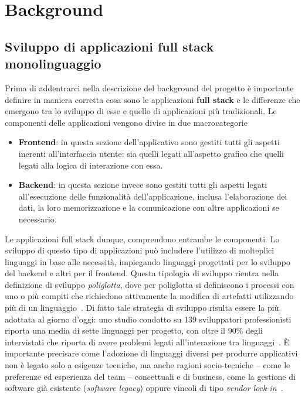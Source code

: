 \section{Background}
\label{chap:background}


\subsection{Sviluppo di applicazioni full stack monolinguaggio}
\label{sec:background-fullstack}
Prima di addentrarci nella descrizione del background del progetto è importante definire in maniera corretta cosa sono le applicazioni \textbf{full stack} e le differenze che emergono tra lo sviluppo di esse e quello di applicazioni più tradizionali.
Le componenti delle applicazioni vengono divise in due macrocategorie
\begin{itemize}
    \item \textbf{Frontend}: in questa sezione dell'applicativo sono gestiti tutti gli aspetti
    inerenti all'interfaccia utente: sia quelli legati all'aspetto grafico che quelli legati alla 
    logica di interazione con essa.
    \item \textbf{Backend}: in questa sezione invece sono gestiti tutti gli aspetti legati\\
    all'esecuzione delle funzionalità dell'applicazione, inclusa l'elaborazione dei dati, la loro
    memorizzazione e la comunicazione con altre applicazioni se necessario. 
\end{itemize}
Le applicazioni full stack dunque, comprendono entrambe le componenti.
Lo sviluppo di questo tipo di applicazioni può includere l'utilizzo di molteplici linguaggi in base alle necessità, impiegando linguaggi progettati per lo sviluppo del backend e altri per il frontend.
Questa tipologia di sviluppo rientra nella definizione di sviluppo \textit{poliglotta}, dove per poliglotta si definiscono i processi con uno o più compiti che richiedono attivamente la modifica di artefatti utilizzando più di un linguaggio~\cite{DBLP:journals/software/MussbacherCKBGJJKMPSSS24}. Di fatto tale strategia di sviluppo risulta essere la più adottata al giorno d'oggi: uno studio condotto su 139 sviluppatori professionisti riporta una media di sette linguaggi per progetto, con oltre il 90\% degli intervistati che riporta di avere problemi legati all'interazione tra linguaggi~\cite{DBLP:journals/jserd/MayerKL17}. 
È importante precisare come l'adozione di linguaggi diversi per produrre applicativi non è legato solo a esigenze tecniche, ma anche ragioni socio-tecniche -- come le preferenze ed esperienza del team -- concettuali e di business, come la gestione di software già esistente (\textit{software legacy}) oppure vincoli di tipo \textit{vendor lock-in}~\cite{DBLP:journals/software/MussbacherCKBGJJKMPSSS24}.
